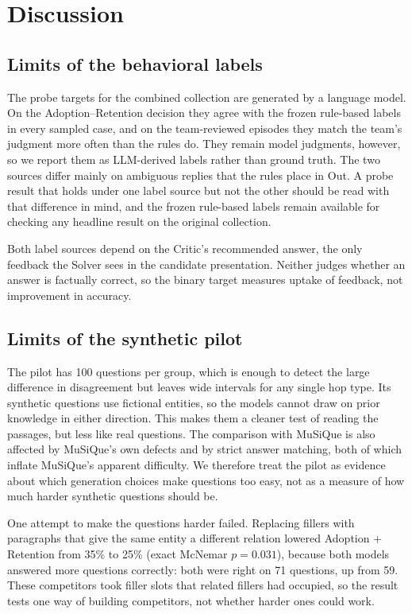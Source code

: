 \section{Discussion}
\label{sec:discussion}


\subsection{Limits of the behavioral labels}
\label{sec:disc-labels}

The probe targets for the combined collection are generated by a language
model. On the Adoption--Retention decision they agree with the frozen
rule-based labels in every sampled case, and on the team-reviewed episodes
they match the team's judgment more often than the rules do. They remain
model judgments, however, so we report them as LLM-derived labels rather
than ground truth. The two sources differ mainly on ambiguous replies that
the rules place in Out. A probe result that holds under one label source but
not the other should be read with that difference in mind, and the frozen
rule-based labels remain available for checking any headline result on the
original collection.

Both label sources depend on the Critic's recommended answer, the only
feedback the Solver sees in the candidate presentation. Neither judges
whether an answer is factually correct, so the binary target measures
uptake of feedback, not improvement in accuracy.

\subsection{Limits of the synthetic pilot}
\label{sec:disc-synthetic}

The pilot has 100 questions per group, which is enough to detect the large
difference in disagreement but leaves wide intervals for any single hop type.
Its synthetic questions use fictional entities, so the models cannot draw on
prior knowledge in either direction. This makes them a cleaner test of
reading the passages, but less like real questions. The comparison with
MuSiQue is also affected by MuSiQue's own defects and by strict answer
matching, both of which inflate MuSiQue's apparent difficulty. We therefore
treat the pilot as evidence about which generation choices make questions
too easy, not as a measure of how much harder synthetic questions should be.

One attempt to make the questions harder failed. Replacing fillers with
paragraphs that give the same entity a different relation lowered
Adoption + Retention from 35\% to 25\% (exact McNemar $p = 0.031$), because
both models answered more questions correctly: both were right on 71
questions, up from 59. These competitors took filler slots that related
fillers had occupied, so the result tests one way of building competitors,
not whether harder ones could work.

